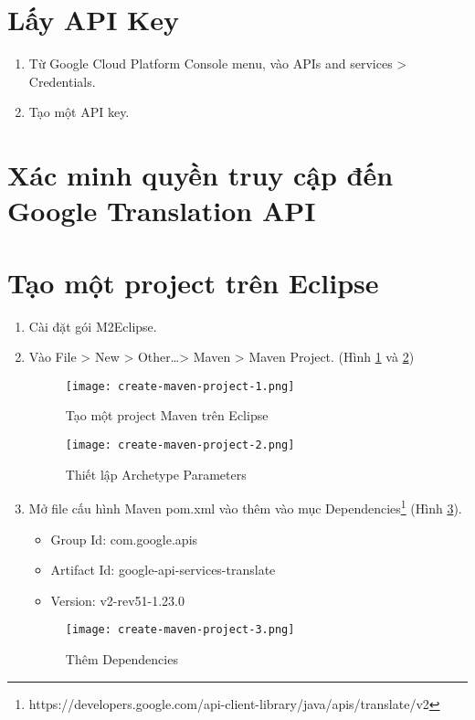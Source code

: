 \documentclass[../thesis.tex]{subfiles}
\begin{document}
\section{Lấy API Key}
\begin{enumerate}
	\item Từ Google Cloud Platform Console menu, vào APIs and services > Credentials.
	\item Tạo một API key.
\end{enumerate}

\section{Xác minh quyền truy cập đến Google Translation API}

\section{Tạo một project trên Eclipse}
\begin{enumerate}
	\item Cài đặt gói M2Eclipse.

	\item Vào File > New > Other\ldots > Maven > Maven Project. (Hình \ref{Tạo một project Maven trên Eclipse} và \ref{Thiết lập Archetype Parameters})
	\begin{figure}
		\texttt{[image: create-maven-project-1.png]}
		\caption{Tạo một project Maven trên Eclipse}
		\label{Tạo một project Maven trên Eclipse}
	\end{figure}
	\begin{figure}
		\texttt{[image: create-maven-project-2.png]}
		\caption{Thiết lập Archetype Parameters}
		\label{Thiết lập Archetype Parameters}
	\end{figure}
	
	\item Mở file cấu hình Maven pom.xml vào thêm vào mục Dependencies\footnote{https://developers.google.com/api-client-library/java/apis/translate/v2} (Hình \ref{Thêm Dependencies}).
	\begin{itemize}
		\item Group Id: com.google.apis
		\item Artifact Id: google-api-services-translate
		\item Version: v2-rev51-1.23.0
	\end{itemize}
	\begin{figure}
		\texttt{[image: create-maven-project-3.png]}
		\caption{Thêm Dependencies}
		\label{Thêm Dependencies}
	\end{figure}
\end{enumerate}
\end{document}
